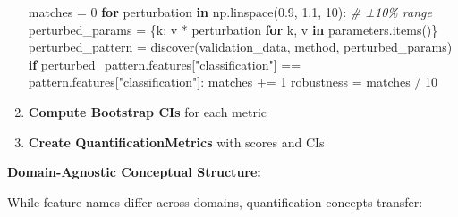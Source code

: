 \documentclass[
]{article}
\newenvironment{Shaded}{}{}
\newcommand{\CommentTok}[1]{\textcolor[rgb]{0.38,0.63,0.69}{\textit{#1}}}
\newcommand{\ControlFlowTok}[1]{\textcolor[rgb]{0.00,0.44,0.13}{\textbf{#1}}}
\newcommand{\DecValTok}[1]{\textcolor[rgb]{0.25,0.63,0.44}{#1}}
\newcommand{\FloatTok}[1]{\textcolor[rgb]{0.25,0.63,0.44}{#1}}
\newcommand{\KeywordTok}[1]{\textcolor[rgb]{0.00,0.44,0.13}{\textbf{#1}}}
\newcommand{\NormalTok}[1]{#1}
\newcommand{\OperatorTok}[1]{\textcolor[rgb]{0.40,0.40,0.40}{#1}}
\newcommand{\StringTok}[1]{\textcolor[rgb]{0.25,0.44,0.63}{#1}}
\begin{document}
\begin{enumerate}
\begin{Shaded}
\begin{Highlighting}[]
\NormalTok{matches }\OperatorTok{=} \DecValTok{0}
\ControlFlowTok{for}\NormalTok{ perturbation }\KeywordTok{in}\NormalTok{ np.linspace(}\FloatTok{0.9}\NormalTok{, }\FloatTok{1.1}\NormalTok{, }\DecValTok{10}\NormalTok{):  }\CommentTok{\# ±10\% range}
\NormalTok{    perturbed\_params }\OperatorTok{=}\NormalTok{ \{k: v }\OperatorTok{*}\NormalTok{ perturbation }\ControlFlowTok{for}\NormalTok{ k, v }\KeywordTok{in}\NormalTok{ parameters.items()\}}
\NormalTok{    perturbed\_pattern }\OperatorTok{=}\NormalTok{ discover(validation\_data, method, perturbed\_params)}
    \ControlFlowTok{if}\NormalTok{ perturbed\_pattern.features[}\StringTok{"classification"}\NormalTok{] }\OperatorTok{==}\NormalTok{ pattern.features[}\StringTok{"classification"}\NormalTok{]:}
\NormalTok{        matches }\OperatorTok{+=} \DecValTok{1}
\NormalTok{robustness }\OperatorTok{=}\NormalTok{ matches }\OperatorTok{/} \DecValTok{10}
\end{Highlighting}
\end{Shaded}
\item
  \textbf{Compute Bootstrap CIs} for each metric
\item
  \textbf{Create QuantificationMetrics} with scores and CIs
\end{enumerate}

\textbf{Domain-Agnostic Conceptual Structure:}

While feature names differ across domains, quantification concepts
transfer:
\end{document}
